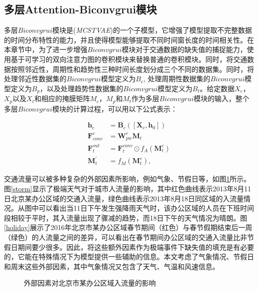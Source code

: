 \subsection{多层Attention-Biconvgrui模块}
多层$Biconvgrui$模块是(\textit{MCSTVAE})的一个子模型，它增强了模型提取不完整数据的时间分布特性的能力，并且使得模型能够提取不同时间窗长度的时间相关性。在本章节中，为了进一步增强$Biconvgrui$模块对于交通数据的缺失值的捕捉能力，使用基于可学习的双向注意力图的卷积模块来替换普通的卷积模块。同时，将交通数据按照邻近性，周期性和趋势性三种时间长度划分成三个不同的数据集。同时，将处理邻近性数据集的$Biconvgrui$模型定义为$B_c$, 处理周期性数据集的$Biconvgrui$模型定义为$B_p$，以及处理趋势性数据集的$Biconvgrui$模型定义为$B_t$。给定数据$X_c$，$X_p$以及$X_t$和相应的掩膜矩阵$M_c$，$M_p$和$M_t$作为多层$Biconvgrui$模块的输入，整个多层$Biconvgrui$模块的计算过程，可以用以下公式表示：

\vspace{-1em}
\begin{subequations}
\begin{align}
\mathbf{h}_{c} & = \mathbf{B}_{c}([\mathbf{X}_{c},\mathbf{h}_0]) \label{dsc_eq} \\
\mathbf{F}^{c}_{conv} & = \mathbf{W}^{c}_{pw}\mathbf{M}_t  \label{mc_eq}\\
\mathbf{F}_{t}^{out} & = \mathbf{F}_{t}^{conv} \odot f_{A}(\mathbf{M}^{c}_{t})  \label{fr_eq}\\
\mathbf{M}^{'}_{t} & = f_{M}(\mathbf{M}^{c}_{t}) \label{mu_eq},
\end{align}
\end{subequations}

交通流量可以被多种复杂的外部因素所影响，例如气象、节假日等，如图\ref{extra_features}所示。图\ref{storm}显示了极端天气对于城市人流量的影响，其中红色曲线表示2013年8月11日北京某办公区域的交通入流量，绿色曲线表示2013年8月18日同区域的入流量情况。从图中可以看出当11日下午发生强降雨天气时，该办公区域的人员在下班时间段相较于平时，其入流量出现了骤减的趋势，而18日下午的天气情况为晴朗。图\ref{holiday}展示了2016年北京市某办公区域春节期间（红色）与春节假期结束后一周（绿色）的人流量之间的差异，可以看出在春节期间办公区域的交通入流量比非节假日期间要少很多。因此，将这些额外因素作为极端事件下缺失值的填充是有必要的，它能在特殊情况下为模型提供一些辅助的信息。本文考虑了气象情况、节假日和周末这些外部因素，其中气象情况又包含了天气、气温和风速信息。

\begin{figure}[htbp] 
	\centering 
	\caption{外部因素对北京市某办公区域入流量的影响} \label{extra_features}
\end{figure}

